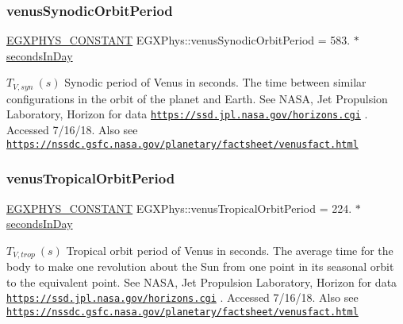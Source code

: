 \subsubsection{\texorpdfstring{venus\+Synodic\+Orbit\+Period}{venusSynodicOrbitPeriod}}
{\footnotesize\ttfamily \mbox{\hyperlink{group___e_g_x_phys-_constants-_macros_ga76980d288494ce1714c9ac68a95ba702}{E\+G\+X\+P\+H\+Y\+S\+\_\+\+C\+O\+N\+S\+T\+A\+NT}} E\+G\+X\+Phys\+::venus\+Synodic\+Orbit\+Period = 583. $\ast$ \mbox{\hyperlink{namespace_e_g_x_phys_a93d2a00d75411b58cbf63ab3fd1f8bc2}{seconds\+In\+Day}}}

$ T_{V,syn} \ (s)$ Synodic period of Venus in seconds. The time between similar configurations in the orbit of the planet and Earth. See N\+A\+SA, Jet Propulsion Laboratory, Horizon for data \href{https://ssd.jpl.nasa.gov/horizons.cgi}{\tt https\+://ssd.\+jpl.\+nasa.\+gov/horizons.\+cgi} . Accessed 7/16/18. Also see \href{https://nssdc.gsfc.nasa.gov/planetary/factsheet/venusfact.html}{\tt https\+://nssdc.\+gsfc.\+nasa.\+gov/planetary/factsheet/venusfact.\+html} \mbox{\label{group___e_g_x_phys-_constants-_astrophysics-_solar_system-_venus-_orbit_ga9a39ee94fd79a4ded9c874b9a5a9bfd1}} 
\subsubsection{\texorpdfstring{venus\+Tropical\+Orbit\+Period}{venusTropicalOrbitPeriod}}
{\footnotesize\ttfamily \mbox{\hyperlink{group___e_g_x_phys-_constants-_macros_ga76980d288494ce1714c9ac68a95ba702}{E\+G\+X\+P\+H\+Y\+S\+\_\+\+C\+O\+N\+S\+T\+A\+NT}} E\+G\+X\+Phys\+::venus\+Tropical\+Orbit\+Period = 224. $\ast$ \mbox{\hyperlink{namespace_e_g_x_phys_a93d2a00d75411b58cbf63ab3fd1f8bc2}{seconds\+In\+Day}}}

$ T_{V,trop} \ (s)$ Tropical orbit period of Venus in seconds. The average time for the body to make one revolution about the Sun from one point in its seasonal orbit to the equivalent point. See N\+A\+SA, Jet Propulsion Laboratory, Horizon for data \href{https://ssd.jpl.nasa.gov/horizons.cgi}{\tt https\+://ssd.\+jpl.\+nasa.\+gov/horizons.\+cgi} . Accessed 7/16/18. Also see \href{https://nssdc.gsfc.nasa.gov/planetary/factsheet/venusfact.html}{\tt https\+://nssdc.\+gsfc.\+nasa.\+gov/planetary/factsheet/venusfact.\+html} 